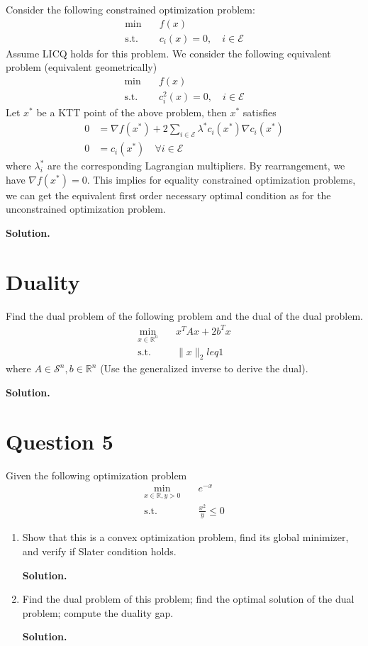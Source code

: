 \documentclass{article}
\begin{document}
\bigskip
Consider the following constrained optimization problem:
\begin{align*}
    \min \quad &f(x) \\
    \text{s.t.} \quad &c_i(x) = 0, \quad i \in \mathcal E 
\end{align*}
Assume LICQ holds for this problem. We consider the following equivalent problem (equivalent geometrically)
\begin{align*}
    \min \quad &f(x) \\
    \text{s.t.} \quad &c_i^2(x) = 0, \quad i \in \mathcal E
\end{align*}
Let $x^*$ be a KTT point of the above problem, then $x^*$ satisfies 
\begin{align*}
    0 &= \nabla f(x^*) + 2 \sum_{i \in \mathcal E} \lambda^* c_i(x^*) \nabla c_i(x^*) \\
    0 &= c_i(x^*) \quad \forall i \in \mathcal E
\end{align*}
where $\lambda_i^*$ are the corresponding Lagrangian multipliers. By rearrangement, we have $\nabla f(x^*) = 0$. This implies for equality constrained optimization problems, we can get the equivalent first order necessary optimal condition as for the unconstrained optimization problem.

\textbf{Solution.}

\section{Duality}
Find the dual problem of the following problem and the dual of the dual problem.
\begin{align*}
    \min_{x \in \mathbb R^n} \quad & x^TAx + 2b^T x \\
    \text{s.t.} \quad & \|x\|_2 leq 1
\end{align*}
where $A \in \mathcal S^n, b \in \mathbb R^n$ (Use the generalized inverse to derive the dual).

\textbf{Solution.}

\section{Question 5}
Given the following optimization problem 
\begin{align*}
    \min_{x \in \mathbb R, y > 0} \quad & e^{-x} \\
    \text{s.t.} \quad & \frac{x^2}{y} \leq 0
\end{align*}
\begin{enumerate}
    \item Show that this is a convex optimization problem, find its global minimizer, and verify if Slater condition holds.
    
    \textbf{Solution.}
    \item Find the dual problem of this problem; find the optimal solution of the dual problem; compute the duality gap.
    
    \textbf{Solution.}
\end{enumerate}
\end{document}
